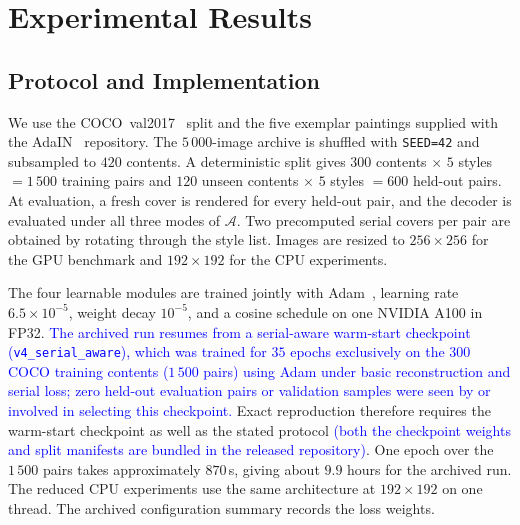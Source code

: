\documentclass[runningheads]{llncs}
\newcommand{\revised}[1]{\textcolor{blue}{#1}}
\begin{document}
\section{Experimental Results}
\label{sec:exp}

\subsection{Protocol and Implementation}
\label{sec:impl}
We use the COCO~val2017~\cite{coco} split and the five exemplar paintings supplied with the AdaIN~\cite{adain} repository. The $5\,000$-image archive is shuffled with \texttt{SEED=42} and subsampled to $420$ contents. A deterministic split gives $300$ contents $\times$ $5$ styles $=1\,500$ training pairs and $120$ unseen contents $\times$ $5$ styles $=600$ held-out pairs. At evaluation, a fresh cover is rendered for every held-out pair, and the decoder is evaluated under all three modes of $\mathcal{A}$. Two precomputed serial covers per pair are obtained by rotating through the style list. Images are resized to $256\!\times\!256$ for the GPU benchmark and $192\!\times\!192$ for the CPU experiments.

The four learnable modules are trained jointly with Adam~\cite{adam}, learning rate $6.5\!\times\!10^{-5}$, weight decay $10^{-5}$, and a cosine schedule on one NVIDIA A100 in FP32. \revised{The archived run resumes from a serial-aware warm-start checkpoint (\texttt{v4\_serial\_aware}), which was trained for $35$ epochs exclusively on the $300$ COCO training contents ($1\,500$ pairs) using Adam under basic reconstruction and serial loss; zero held-out evaluation pairs or validation samples were seen by or involved in selecting this checkpoint.} Exact reproduction therefore requires the warm-start checkpoint as well as the stated protocol \revised{(both the checkpoint weights and split manifests are bundled in the released repository)}. One epoch over the $1\,500$ pairs takes approximately $870$\,s, giving about $9.9$ hours for the archived run. The reduced CPU experiments use the same architecture at $192\!\times\!192$ on one thread. The archived configuration summary records the loss weights.
\end{document}
